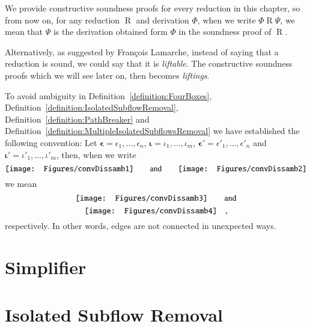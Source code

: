 \begin{convention}
We provide constructive soundness proofs for every reduction in this chapter, so from now on, for any reduction $\mathrel{R}$ and derivation $\Phi$, when we write $\Phi\mathrel{R}\Psi$, we mean that $\Psi$ is the derivation obtained form $\Phi$ in the soundness proof of $\mathrel{R}$.
\end{convention}

\begin{remark}\label{remark:lifting}
Alternatively, as suggested by Fran\c{c}ois Lamarche, instead of saying that a reduction is sound, we could say that it is \emph{liftable}. The constructive soundness proofs which we will see later on, then becomes \emph{liftings}.
\end{remark}

\begin{convention}
To avoid ambiguity in Definition~\vref{definition:FourBoxes}, Definition~\vref{definition:IsolatedSubflowRemoval}, Definition~\vref{definition:PathBreaker} and Definition~\vref{definition:MultipleIsolatedSubflowsRemoval} we have established the following convention:
Let $\boldsymbol\epsilon=\epsilon_1,\dots,\epsilon_n$, $\boldsymbol\iota=\iota_1,\dots,\iota_m$, $\boldsymbol{\epsilon'}=\epsilon'_1,\dots,\epsilon'_n$ and $\boldsymbol{\iota'}=\iota'_1,\dots,\iota'_m$, then, when we write
\[
\vcenter{\hbox{\texttt{[image: Figures/convDissamb1]}}}
\qquad\mbox{and}\qquad
\vcenter{\hbox{\texttt{[image: Figures/convDissamb2]}}}
\]
we mean
\[
\vcenter{\hbox{\texttt{[image: Figures/convDissamb3]}}}
\qquad\mbox{and}
\]
\[
\vcenter{\hbox{\texttt{[image: Figures/convDissamb4]}}}
\quad,
\]
respectively. In other words, edges are not connected in unexpected ways.
\end{convention}

\section{Simplifier}\label{section:Simplifier}



\section{Isolated Subflow Removal}\label{section:IsolatedSubflowRemoval}

